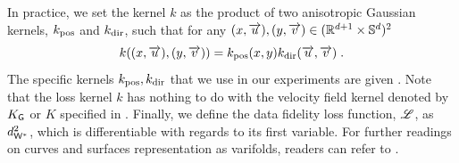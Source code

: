 In practice, we set the kernel $k$ as the product of two anisotropic Gaussian kernels, $k_{\mathrm{pos}}$ and $k_{\mathrm{dir}}$, 
such that for any $(x,\overrightarrow{u}),(y,\overrightarrow{v}) \in (\mathbb{R}^{d+1} \times \mathbb{S}^d)^2$
\begin{equation}
    k((x,\overrightarrow{u}),(y,\overrightarrow{v})) = k_{\mathrm{pos}}(x,y)k_{\mathrm{dir}}(\overrightarrow{u},\overrightarrow{v}) \;.
  \end{equation}
  The specific kernels $k_{\mathrm{pos}},k_{\mathrm{dir}}$ that we use in our experiments are given .
   Note that the loss kernel $k$ has nothing to do with the velocity field kernel denoted by $K_{\mathsf{G}}$ or $K$ specified in .
Finally, we define the data fidelity loss function, $\mathscr{L}$, as $ d_{\mathsf{W}^*}^2$, which is differentiable with regards to its first variable.
For further readings on curves and surfaces representation as varifolds, readers can refer to \cite{kaltenmark2017general,charon2013varifold}. 


